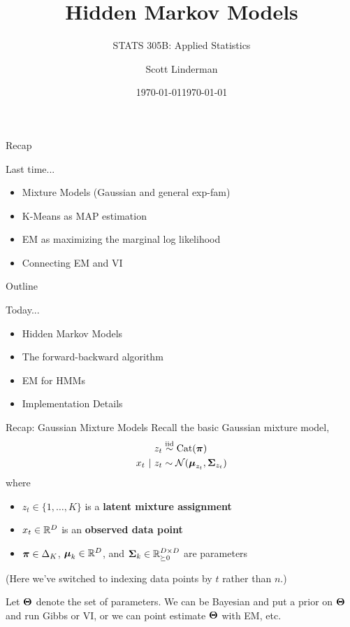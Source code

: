 \documentclass[aspectratio=169]{beamer}
\title{Hidden Markov Models}
\subtitle{STATS 305B: Applied Statistics}
\author{Scott Linderman}
\date{\today}
\date{\today}
\begin{document}
\maketitle


\begin{frame}{Recap}

    Last time...
    \begin{itemize}
        \item Mixture Models (Gaussian and general exp-fam)
        \item K-Means as MAP estimation
        \item EM as maximizing the marginal log likelihood
        \item Connecting EM and VI
    \end{itemize}
    
\end{frame}
    
    
\begin{frame}{Outline}
    
    Today...
    \begin{itemize}
        \item Hidden Markov Models
        \item The forward-backward algorithm
        \item EM for HMMs
        \item Implementation Details
    \end{itemize}
    
\end{frame}
    

\begin{frame}{Recap: Gaussian Mixture Models}
Recall the basic Gaussian mixture model,
\begin{align}
    z_t &\stackrel{\text{iid}}{\sim} \mathrm{Cat}(\boldsymbol{\pi}) \\
    x_t ~\vert~ z_t &\sim \mathcal{N}(\boldsymbol{\mu}_{z_t}, \boldsymbol{\Sigma}_{z_t})
\end{align}
where 
\begin{itemize}
    \item $z_t \in \{1,\ldots,K\}$ is a \textbf{latent mixture assignment}
    \item $x_t \in \mathbb{R}^D$ is an \textbf{observed data point}
    \item $\boldsymbol{\pi} \in \Delta_K$, $\boldsymbol{\mu}_k \in \mathbb{R}^D$, and $\boldsymbol{\Sigma}_k \in \mathbb{R}_{\succeq 0}^{D \times D}$ are parameters
\end{itemize}
(Here we've switched to indexing data points by $t$ rather than $n$.)

Let $\boldsymbol{\Theta}$ denote the set of parameters. We can be Bayesian and put a prior on $\boldsymbol{\Theta}$ and run Gibbs or VI, or we can point estimate $\boldsymbol{\Theta}$ with EM, etc.
\end{frame}
\end{document}

